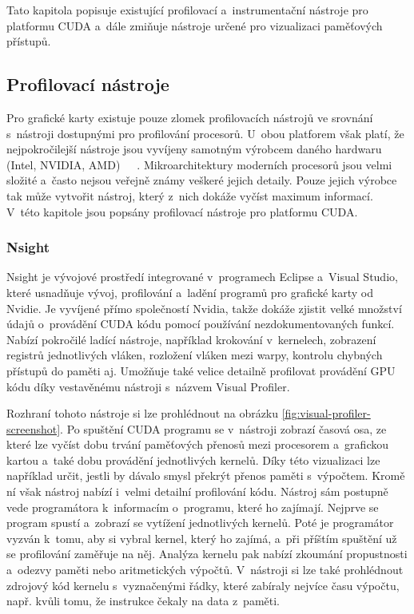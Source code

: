 Tato kapitola popisuje existující profilovací a~instrumentační nástroje pro platformu CUDA a~dále zmiňuje nástroje určené pro vizualizaci paměťových přístupů.

\subsection{Profilovací nástroje}
Pro grafické karty existuje pouze zlomek profilovacích nástrojů ve srovnání s~nástroji dostupnými pro profilování procesorů. U~obou platforem však platí, že nejpokročilejší nástroje jsou vyvíjeny samotným výrobcem daného hardwaru (Intel, NVIDIA, AMD)~\cite{vtune}~\cite{nsight}~\cite{codexl}. Mikroarchitektury moderních procesorů jsou velmi složité a~často nejsou veřejně známy veškeré jejich detaily. Pouze jejich výrobce tak může vytvořit nástroj, který z~nich dokáže vyčíst maximum informací. V~této kapitole jsou popsány profilovací nástroje pro platformu CUDA.

\subsubsection{Nsight}
Nsight je vývojové prostředí integrované v~programech Eclipse a~Visual Studio, které usnadňuje vývoj, profilování a~ladění programů pro grafické karty od Nvidie. Je vyvíjené přímo společností Nvidia, takže dokáže zjistit velké množství údajů o~provádění CUDA kódu pomocí používání nezdokumentovaných funkcí. Nabízí pokročilé ladící nástroje, například krokování v~kernelech, zobrazení registrů jednotlivých vláken, rozložení vláken mezi warpy, kontrolu chybných přístupů do paměti aj. Umožňuje také velice detailně profilovat provádění GPU kódu díky vestavěnému nástroji s~názvem Visual Profiler.

Rozhraní tohoto nástroje si lze prohlédnout na obrázku \ref{fig:visual-profiler-screenshot}. Po spuštění CUDA programu se v~nástroji zobrazí časová osa, ze které lze vyčíst dobu trvání paměťových přenosů mezi procesorem a~grafickou kartou a~také dobu provádění jednotlivých kernelů. Díky této vizualizaci lze například určit, jestli by dávalo smysl překrýt přenos paměti s~výpočtem. Kromě ní však nástroj nabízí i~velmi detailní profilování kódu. Nástroj sám postupně vede programátora k~informacím o~programu, které ho zajímají. Nejprve se program spustí a~zobrazí se vytížení jednotlivých kernelů. Poté je programátor vyzván k~tomu, aby si vybral kernel, který ho zajímá, a~při příštím spuštění už se profilování zaměřuje na něj. Analýza kernelu pak nabízí zkoumání propustnosti a~odezvy paměti nebo aritmetických výpočtů. V~nástroji si lze také prohlédnout zdrojový kód kernelu s~vyznačenými řádky, které zabíraly nejvíce času výpočtu, např. kvůli tomu, že instrukce čekaly na data z~paměti.

